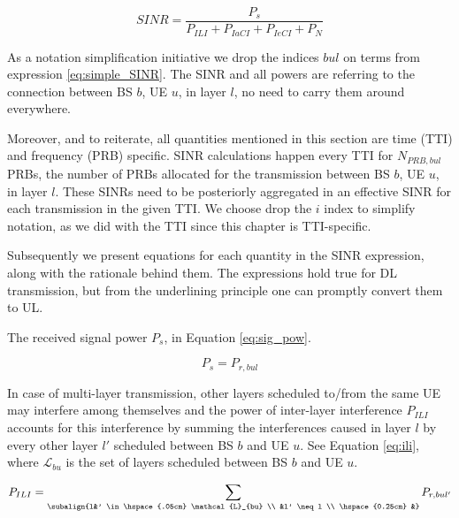 \begin{equation} \label{eq:simple_SINR}
    SINR = \frac{P_s}{P_{ILI} + P_{IaCI} + P_{IeCI} + P_N}
\end{equation}

As a notation simplification initiative we drop the indices $bul$ on terms from expression \eqref{eq:simple_SINR}. The SINR and all powers are referring to the connection between BS $b$, UE $u$, in layer $l$, no need to carry them around everywhere.

Moreover, and to reiterate, all quantities mentioned in this section are time (TTI) and frequency (PRB) specific. SINR calculations happen every TTI for $N_{PRB, bul}$ PRBs, the number of PRBs allocated for the transmission between BS $b$, UE $u$, in layer $l$. These SINRs need to be posteriorly aggregated in an effective SINR for each transmission in the given TTI. We choose drop the $i$ index to simplify notation, as we did with the TTI since this chapter is TTI-specific.


Subsequently we present equations for each quantity in the SINR expression, along with the rationale behind them. The expressions hold true for DL transmission, but from the underlining principle one can promptly convert them to UL.

The received signal power $P_s$, in Equation \eqref{eq:sig_pow}.

\begin{equation} \label{eq:sig_pow}
    P_s = P_{r, bul} 
\end{equation}


In case of multi-layer transmission, other layers scheduled to/from the same UE may interfere among themselves and the power of inter-layer interference $P_{ILI}$ accounts for this interference by summing the interferences caused in layer $l$ by every other layer $l'$ scheduled between BS $b$ and UE $u$. See Equation \eqref{eq:ili}, where $\mathcal{L}_{bu}$ is the set of layers scheduled between BS $b$ and UE $u$.

\begin{equation} \label{eq:ili}
    P_{ILI} = \sum_{\subalign{l&' \in \hspace{.05cm} \mathcal{L}_{bu} \\ &l' \neq l \\ \hspace{0.25cm} &}} P_{r, bul'} 
\end{equation}


